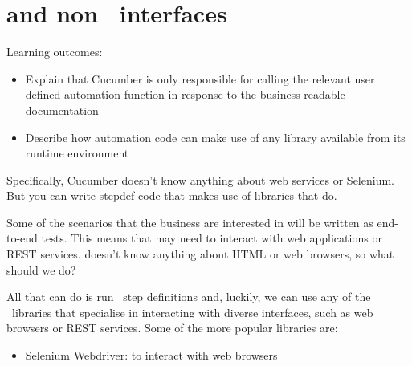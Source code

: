 \chapter*{\CUKE{} and non \ interfaces}

\ifnotes

    Learning outcomes:
    
    \begin{itemize}
        \item Explain that Cucumber is only responsible for calling the relevant user defined automation function in response to the business-readable documentation
        \item Describe how automation code can make use of any library available from its runtime environment
    \end{itemize}

    Specifically, Cucumber doesn't know anything about web services or Selenium. But you can write stepdef code that makes use of libraries that do.
\fi 

\ifcontent 
    Some of the scenarios that the business are interested in will be written as end-to-end tests. This means that \CUKE{} may need to interact with web applications or REST services. \CUKE{} doesn't know anything about HTML or web browsers, so what should we do?
    
    All that \CUKE{} can do is run \ step definitions and, luckily, we can use any of the \ libraries that specialise in interacting with diverse interfaces, such as web browsers or REST services. Some of the more popular libraries are:
    
    \begin{itemize}
        \item Selenium Webdriver: to interact with web browsers
    
    \end{itemize}
    
